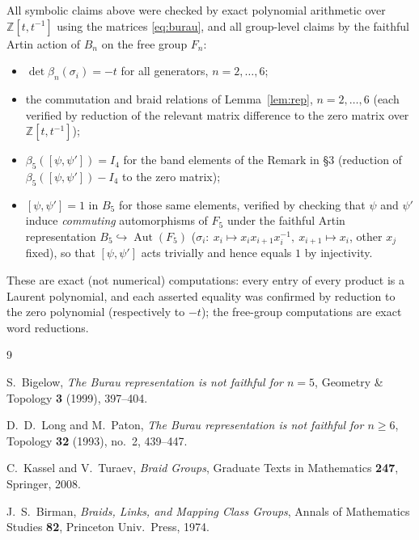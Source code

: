 \documentclass{amsart}
\theoremstyle{remark}
\begin{document}
All symbolic claims above were checked by exact polynomial arithmetic over
$\mathbb Z[t,t^{-1}]$ using the matrices \eqref{eq:burau}, and all group-level
claims by the faithful Artin action of $B_n$ on the free group $F_n$:
\begin{itemize}
\item $\det\beta_n(\sigma_i)=-t$ for all generators, $n=2,\dots,6$;
\item the commutation and braid relations of Lemma~\ref{lem:rep}, $n=2,\dots,6$
(each verified by reduction of the relevant matrix difference to the zero
matrix over $\mathbb Z[t,t^{-1}]$);
\item $\beta_5([\psi,\psi'])=I_4$ for the band elements of the Remark in \S3
(reduction of $\beta_5([\psi,\psi'])-I_4$ to the zero matrix);
\item $[\psi,\psi']=1$ in $B_5$ for those same elements, verified by checking
that $\psi$ and $\psi'$ induce \emph{commuting} automorphisms of $F_5$ under the
faithful Artin representation $B_5\hookrightarrow\operatorname{Aut}(F_5)$
($\sigma_i:\ x_i\mapsto x_ix_{i+1}x_i^{-1},\ x_{i+1}\mapsto x_i$, other
$x_j$ fixed), so that $[\psi,\psi']$ acts trivially and hence equals $1$ by
injectivity.
\end{itemize}
These are exact (not numerical) computations: every entry of every product is a
Laurent polynomial, and each asserted equality was confirmed by reduction to the
zero polynomial (respectively to $-t$); the free-group computations are exact
word reductions.

\begin{thebibliography}{9}

S.~Bigelow,
\emph{The Burau representation is not faithful for $n=5$},
Geometry \& Topology \textbf{3} (1999), 397--404.

D.~D.~Long and M.~Paton,
\emph{The Burau representation is not faithful for $n\ge6$},
Topology \textbf{32} (1993), no.~2, 439--447.

C.~Kassel and V.~Turaev,
\emph{Braid Groups},
Graduate Texts in Mathematics \textbf{247}, Springer, 2008.

J.~S.~Birman,
\emph{Braids, Links, and Mapping Class Groups},
Annals of Mathematics Studies \textbf{82}, Princeton Univ.\ Press, 1974.

\end{thebibliography}
\end{document}
